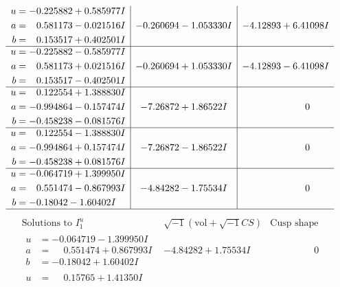 \documentclass[1p]{elsarticle_modified}
\theoremstyle{definition}
\newcommand{\I}{\sqrt{-1}}
\begin{document}
$$\begin{array}{c|c|c}
\begin{aligned}
u &= -0.225882 + 0.585977 I \\
a &= \phantom{-}0.581173 - 0.021516 I \\
b &= \phantom{-}0.153517 + 0.402501 I\end{aligned}
 & -0.260694 - 1.053330 I & -4.12893 + 6.41098 I \\ \hline\begin{aligned}
u &= -0.225882 - 0.585977 I \\
a &= \phantom{-}0.581173 + 0.021516 I \\
b &= \phantom{-}0.153517 - 0.402501 I\end{aligned}
 & -0.260694 + 1.053330 I & -4.12893 - 6.41098 I \\ \hline\begin{aligned}
u &= \phantom{-}0.122554 + 1.388830 I \\
a &= -0.994864 - 0.157474 I \\
b &= -0.458238 - 0.081576 I\end{aligned}
 & -7.26872 + 1.86522 I & \phantom{-0.000000 } 0 \\ \hline\begin{aligned}
u &= \phantom{-}0.122554 - 1.388830 I \\
a &= -0.994864 + 0.157474 I \\
b &= -0.458238 + 0.081576 I\end{aligned}
 & -7.26872 - 1.86522 I & \phantom{-0.000000 } 0 \\ \hline\begin{aligned}
u &= -0.064719 + 1.399950 I \\
a &= \phantom{-}0.551474 - 0.867993 I \\
b &= -0.18042 - 1.60402 I\end{aligned}
 & -4.84282 - 1.75534 I & \phantom{-0.000000 } 0\\
 \hline 
 \end{array}$$\newpage$$\begin{array}{c|c|c}  
\text{Solutions to }I^u_{1}& \I (\text{vol} + \sqrt{-1}CS) & \text{Cusp shape}\\
 \hline 
\begin{aligned}
u &= -0.064719 - 1.399950 I \\
a &= \phantom{-}0.551474 + 0.867993 I \\
b &= -0.18042 + 1.60402 I\end{aligned}
 & -4.84282 + 1.75534 I & \phantom{-0.000000 } 0 \\ \hline\begin{aligned}
u &= \phantom{-}0.15765 + 1.41350 I \\

\end{aligned}
\end{array}$$
\end{document}
